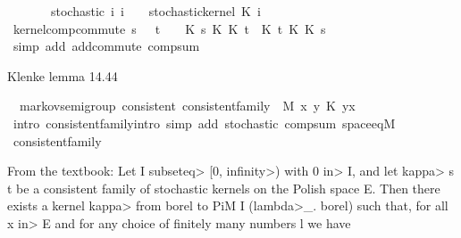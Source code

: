 \begin{isabellebody}
\ \ \ \ \ \ \ stochastic{\isacharcolon}{\kern0pt}\ {\isachardoublequoteopen}{\isasymAnd}i{\isachardot}{\kern0pt}\ i\ {\isasymge}\ {}\ {\isasymLongrightarrow}\ stochastic{\isacharunderscore}{\kern0pt}kernel\ {\isacharparenleft}{\kern0pt}K\ i{\isacharparenright}{\kern0pt}{\isachardoublequoteclose}\isanewline
{}\isanewline
\isanewline
{}\isamarkupfalse%
\ kernel{\isacharunderscore}{\kern0pt}comp{\isacharunderscore}{\kern0pt}commute{\isacharcolon}{\kern0pt}\ {\isachardoublequoteopen}{\isasymlbrakk}s\ {\isasymge}\ {}{\isacharsemicolon}{\kern0pt}\ t\ {\isasymge}\ {}{\isasymrbrakk}\ {\isasymLongrightarrow}\ K\ s\ {\isasymcirc}\isactrlsub K\ K\ t\ {\isacharequal}{\kern0pt}\ K\ t\ {\isasymcirc}\isactrlsub K\ K\ s{\isachardoublequoteclose}\isanewline
%
\isadelimproof
\ \ %
\endisadelimproof
%
\isatagproof
{}\isamarkupfalse%
\ {\isacharparenleft}{\kern0pt}simp\ add{\isacharcolon}{\kern0pt}\ add{\isachardot}{\kern0pt}commute\ comp{\isacharunderscore}{\kern0pt}sum{\isacharparenright}{\kern0pt}%
\endisatagproof
{\isafoldproof}%
%
\isadelimproof
%
\endisadelimproof
%
\begin{isamarkuptext}%
Klenke lemma 14.44%
\end{isamarkuptext}\isamarkuptrue%
\isamarkupfalse%
\ {\isacharparenleft}{\kern0pt}\ markov{\isacharunderscore}{\kern0pt}semigroup{\isacharparenright}{\kern0pt}\ consistent{\isacharcolon}{\kern0pt}\ {\isachardoublequoteopen}consistent{\isacharunderscore}{\kern0pt}family\ {\isacharbraceleft}{\kern0pt}{}{\isachardot}{\kern0pt}{\isachardot}{\kern0pt}{\isacharbraceright}{\kern0pt}\ M\ {\isacharparenleft}{\kern0pt}{\isasymlambda}x\ y{\isachardot}{\kern0pt}\ K\ {\isacharparenleft}{\kern0pt}y{\isacharminus}{\kern0pt}x{\isacharparenright}{\kern0pt}{\isacharparenright}{\kern0pt}{\isachardoublequoteclose}\isanewline
%
\isadelimproof
\ \ %
\endisadelimproof
%
\isatagproof
{}\isamarkupfalse%
\ {\isacharparenleft}{\kern0pt}intro\ consistent{\isacharunderscore}{\kern0pt}family{\isachardot}{\kern0pt}intro{\isacharsemicolon}{\kern0pt}\ simp\ add{\isacharcolon}{\kern0pt}\ stochastic\ comp{\isacharunderscore}{\kern0pt}sum\ space{\isacharunderscore}{\kern0pt}eq{\isacharunderscore}{\kern0pt}M{\isacharparenright}{\kern0pt}%
\endisatagproof
{\isafoldproof}%
%
\isadelimproof
\isanewline
%
\endisadelimproof
{}\isamarkupfalse%
\isanewline
\isanewline
{}\isamarkupfalse%
\ consistent{\isacharunderscore}{\kern0pt}family\isanewline
{}%
\isadelimdocument
%
\endisadelimdocument
%
\isatagdocument
%
\isamarkuptrue%
%
\endisatagdocument
{\isafolddocument}%
%
\isadelimdocument
%
\endisadelimdocument
%
\begin{isamarkuptext}%
From the textbook: Let I \<subseteq> [0, \<infinity>) with 0 \<in> I, and let \<kappa> s t be a consistent family of 
  stochastic kernels on the Polish space E.
  Then there exists a kernel \<kappa> from borel to PiM I (\<lambda>_. borel) such that, for
  all x \<in> E and for any choice of finitely many numbers l we have


\end{isamarkuptext}
\end{isabellebody}
